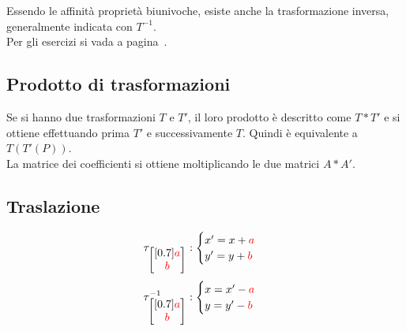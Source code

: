 Essendo le affinità proprietà biunivoche, esiste anche la trasformazione inversa, generalmente 
indicata con $T^{-1}$.\\
Per gli esercizi si vada a pagina~\pageref{ex:aff}.

\subsection{Prodotto di trasformazioni}
Se si hanno due trasformazioni $T$ e $T'$, il loro prodotto è descritto come $T\ast T'$ e si ottiene
effettuando prima $T'$ e successivamente $T$. Quindi è equivalente a $T(T'(P))$.\\
La matrice dei coefficienti si ottiene moltiplicando le due matrici $A\ast A'$.

\subsection{Traslazione}
\begin{center}
\end{center}
\begin{equation*}
  \tau_{\begin{bmatrix}[0.7]
      \mathcolor{red}{a}\\\mathcolor{red}{b}
  \end{bmatrix}}:
  \begin{cases}
    x'= x+\mathcolor{red}{a}\\
    y'= y+\mathcolor{red}{b}
  \end{cases}
\end{equation*}
\begin{equation*}
  \tau_{\begin{bmatrix}[0.7]
      \mathcolor{red}{a}\\\mathcolor{red}{b}
  \end{bmatrix}}^{-1}:
  \begin{cases}
    x = x'-\mathcolor{red}{a}\\
    y = y'-\mathcolor{red}{b}
  \end{cases}
\end{equation*}


